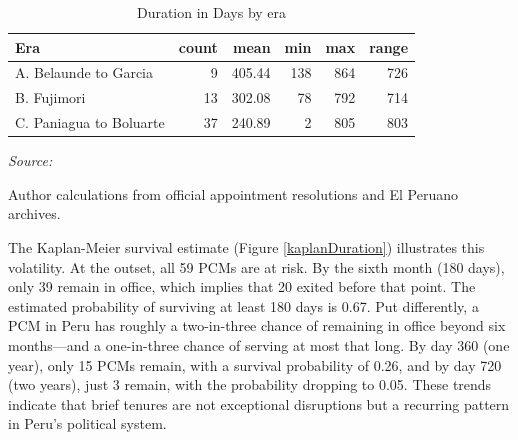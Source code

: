 \documentclass[a4paper, 12pt]{article}
\begin{document}
\begin{table}[!h]
\centering
\caption{Duration in Days by era\label{tab:durationPerEra}}
\centering
\begin{threeparttable}
\begin{tabular}[t]{lrrrrr}
\toprule
Era & count & mean & min & max & range\\
\midrule
A. Belaunde to Garcia & 9 & 405.44 & 138 & 864 & 726\\
B. Fujimori & 13 & 302.08 & 78 & 792 & 714\\
C. Paniagua to Boluarte & 37 & 240.89 & 2 & 805 & 803\\
\bottomrule
\end{tabular}
\begin{tablenotes}[para]
\item \textit{Source: } 
\item Author calculations from official appointment resolutions and El Peruano archives.
\end{tablenotes}
\end{threeparttable}
\end{table}

The Kaplan-Meier survival estimate (Figure \ref{kaplanDuration}) illustrates this volatility. At the outset, all 59 PCMs are at risk. By the sixth month (180 days), only 39 remain in office, which implies that 20 exited before that point. The estimated probability of surviving at least 180 days is 0.67. Put differently, a PCM in Peru has roughly a two-in-three chance of remaining in office beyond six months—and a one-in-three chance of serving at most that long. By day 360 (one year), only 15 PCMs remain, with a survival probability of 0.26, and by day 720 (two years), just 3 remain, with the probability dropping to 0.05. These trends indicate that brief tenures are not exceptional disruptions but a recurring pattern in Peru’s political system.
\end{document}
